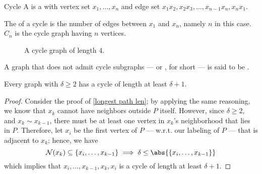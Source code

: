 \documentclass[a4paper, 12pt]{report}
\begin{document}
    \begin{frameddefn}{Cycle}
        A  is a  with vertex set $x_1, \ldots, x_n$ and edge set $x_1x_2, x_2x_3, \ldots, x_{n- 1}x_n, x_nx_1$.

        The  of a cycle is the number of edges between $x_1$ and $x_n$, namely $n$ in this case. $C_n$ is the cycle graph having $n$ vertices.
    \end{frameddefn}

        \begin{figure}[H]
        \centering
        \caption{A cycle graph of length 4.}
    \end{figure}

    A graph that does not admit cycle subgraphs --- or , for short --- is said to be .

    \begin{framedprop}[label={min deg 2}]{}
        Every graph with $\delta \ge 2$ has a cycle of length at least $\delta + 1$.
    \end{framedprop}

    \begin{proof}
        Consider the proof of \cref{longest path len}; by applying the same reasoning, we know that $x_k$ cannot have neighbors outside $P$ itself. However, since $\delta \ge 2$, and $x_k \sim x_{k - 1}$, there must be at least one vertex in $x_k$'s neighborhood that lies in $P$. Therefore, let $x_i$ be the first vertex of $P$ --- w.r.t. our labeling of $P$ --- that is adjacent to $x_k$; hence, we have $$\mathcal N (x_k) \subseteq \{x_i, \ldots, x_{k - 1}\} \implies \delta \le \abs{\{x_i, \ldots, x_{k - 1}\}}$$ which implies that $x_i, \ldots, x_{k - 1}, x_k, x_i$ is a cycle of length at least $\delta + 1$.
    \end{proof}
\end{document}
